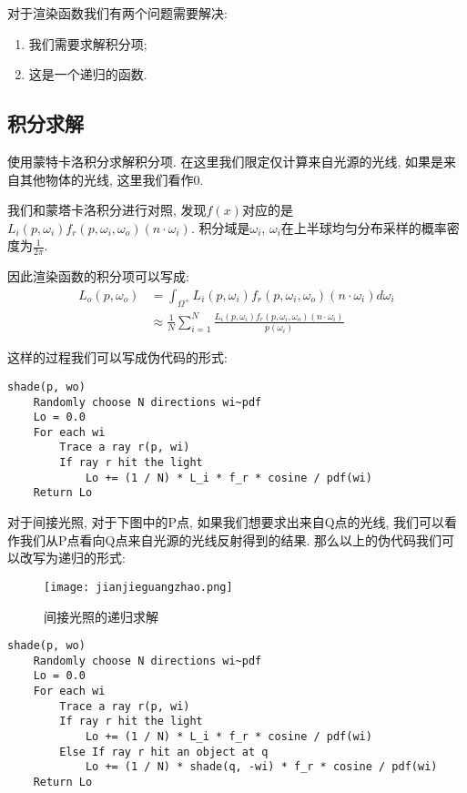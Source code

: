 \documentclass[openany]{progbookcn}
\begin{document}
对于渲染函数我们有两个问题需要解决: 
\begin{enumerate}
	\item 我们需要求解积分项; 
	\item 这是一个递归的函数. 
\end{enumerate}

\subsection{积分求解}

使用蒙特卡洛积分求解积分项. 在这里我们限定仅计算来自光源的光线, 如果是来自其他物体的光线, 这里我们看作0.

我们和蒙塔卡洛积分进行对照, 发现$f(x)$对应的是$L_i(p,\omega_i)f_r(p,\omega_i,\omega_o)(n\cdot \omega_i)$. 积分域是$\omega_i$, $\omega_i$在上半球均匀分布采样的概率密度为$\frac{1}{2\pi}$. 

因此渲染函数的积分项可以写成: 
\begin{equation}
	\begin{split}
		L_o(p,\omega_o)&=\int_{\Omega^+}L_i(p,\omega_i)f_r(p,\omega_i,\omega_o)(n\cdot \omega_i)d\omega_i\\
		&\approx \frac{1}{N}\sum_{i=1}^{N}\frac{L_i(p,\omega_i)f_r(p,\omega_i,\omega_o)(n\cdot \omega_i)}{p(\omega_i)}
	\end{split}
\end{equation}

这样的过程我们可以写成伪代码的形式: 
\begin{lstlisting}[caption=渲染函数积分项对光源光线求解伪代码]
shade(p, wo)
	Randomly choose N directions wi~pdf
	Lo = 0.0
	For each wi
		Trace a ray r(p, wi)
		If ray r hit the light
			Lo += (1 / N) * L_i * f_r * cosine / pdf(wi)
	Return Lo
\end{lstlisting}

对于间接光照, 对于下图中的P点, 如果我们想要求出来自Q点的光线, 我们可以看作我们从P点看向Q点来自光源的光线反射得到的结果. 那么以上的伪代码我们可以改写为递归的形式: 


\begin{figure}[H]
	\centering
	\texttt{[image: jianjieguangzhao.png]}
	\caption{间接光照的递归求解}
	\label{fig:jjgz}
\end{figure}

\begin{lstlisting}[caption=渲染函数积分项的递归求解伪代码]
shade(p, wo)
	Randomly choose N directions wi~pdf
	Lo = 0.0
	For each wi
		Trace a ray r(p, wi)
		If ray r hit the light
			Lo += (1 / N) * L_i * f_r * cosine / pdf(wi)
		Else If ray r hit an object at q
			Lo += (1 / N) * shade(q, -wi) * f_r * cosine / pdf(wi)
	Return Lo
\end{lstlisting}
\end{document}
